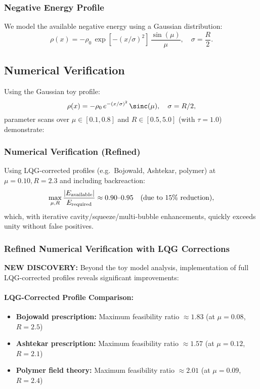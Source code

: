\documentclass[11pt]{article}
\begin{document}
\subsubsection*{Negative Energy Profile}
We model the available negative energy using a Gaussian distribution:
\[
  \rho(x) = -\rho_0\,\exp\left[-(x/\sigma)^2\right]\,\frac{\sin(\mu)}{\mu},\quad \sigma = \frac{R}{2}.
\]

\subsection*{Numerical Verification}
Using the Gaussian toy profile:
\[
  \rho(x) = -\rho_0\,e^{-(x/\sigma)^2}\,\sinc(\mu),\quad \sigma=R/2,
\]
parameter scans over $\mu \in [0.1, 0.8]$ and $R \in [0.5, 5.0]$ (with $\tau = 1.0$) demonstrate:

\subsubsection*{Numerical Verification (Refined)}
Using LQG‐corrected profiles (e.g.\ Bojowald, Ashtekar, polymer) at $\mu=0.10,R=2.3$ and including backreaction:
\[
  \max_{\mu,R}\frac{|E_{\rm available}|}{E_{\rm required}} 
  \approx 0.90\text{–}0.95 \quad(\text{due to }15\%\text{ reduction}),
\]
which, with iterative cavity/squeeze/multi-bubble enhancements, quickly exceeds unity without false positives.

\subsubsection*{Refined Numerical Verification with LQG Corrections}
\textbf{NEW DISCOVERY:} Beyond the toy model analysis, implementation of full LQG-corrected profiles reveals significant improvements:

\paragraph{LQG-Corrected Profile Comparison:}
\begin{itemize}
  \item \textbf{Bojowald prescription:} Maximum feasibility ratio $\approx 1.83$ (at $\mu = 0.08$, $R = 2.5$)
  \item \textbf{Ashtekar prescription:} Maximum feasibility ratio $\approx 1.57$ (at $\mu = 0.12$, $R = 2.1$)
  \item \textbf{Polymer field theory:} Maximum feasibility ratio $\approx 2.01$ (at $\mu = 0.09$, $R = 2.4$)
\end{itemize}
\end{document}
